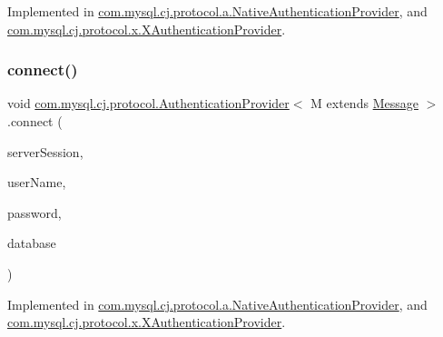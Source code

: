Implemented in \mbox{\hyperlink{classcom_1_1mysql_1_1cj_1_1protocol_1_1a_1_1_native_authentication_provider_a5cf1296206b1d2ceb53440428a37d6f8}{com.\+mysql.\+cj.\+protocol.\+a.\+Native\+Authentication\+Provider}}, and \mbox{\hyperlink{classcom_1_1mysql_1_1cj_1_1protocol_1_1x_1_1_x_authentication_provider_afd444d5b0926e61a8b14b6300aa739cc}{com.\+mysql.\+cj.\+protocol.\+x.\+X\+Authentication\+Provider}}.

\mbox{\label{interfacecom_1_1mysql_1_1cj_1_1protocol_1_1_authentication_provider_a9fa5f015000ed27fdd7e6397317fe423}} 
\subsubsection{\texorpdfstring{connect()}{connect()}}
{\footnotesize\ttfamily void \mbox{\hyperlink{interfacecom_1_1mysql_1_1cj_1_1protocol_1_1_authentication_provider}{com.\+mysql.\+cj.\+protocol.\+Authentication\+Provider}}$<$ M extends \mbox{\hyperlink{interfacecom_1_1mysql_1_1cj_1_1protocol_1_1_message}{Message}} $>$.connect (\begin{DoxyParamCaption}\item[{\mbox{\hyperlink{interfacecom_1_1mysql_1_1cj_1_1protocol_1_1_server_session}{Server\+Session}}}]{server\+Session,  }\item[{String}]{user\+Name,  }\item[{String}]{password,  }\item[{String}]{database }\end{DoxyParamCaption})}



Implemented in \mbox{\hyperlink{classcom_1_1mysql_1_1cj_1_1protocol_1_1a_1_1_native_authentication_provider_a2293502a6ebd37746dcada2f4b0a9c23}{com.\+mysql.\+cj.\+protocol.\+a.\+Native\+Authentication\+Provider}}, and \mbox{\hyperlink{classcom_1_1mysql_1_1cj_1_1protocol_1_1x_1_1_x_authentication_provider_a1454c94a9b23f6302cc37a2efa714b9d}{com.\+mysql.\+cj.\+protocol.\+x.\+X\+Authentication\+Provider}}.

\mbox{\label{interfacecom_1_1mysql_1_1cj_1_1protocol_1_1_authentication_provider_ae63de16063f4716896124e2a70ce18e6}} 
